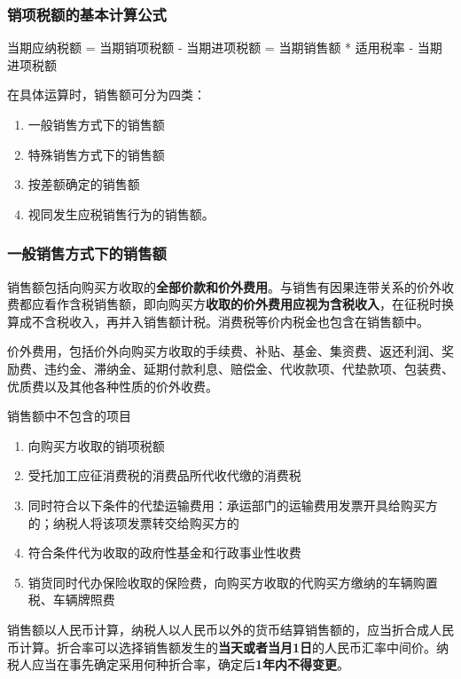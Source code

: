 \documentclass[UTF8,12pt]{ctexart}
\numberwithin{equation}{section} %
\numberwithin{figure}{section}
\numberwithin{table}{section}
\begin{document}
	\subsubsection{销项税额的基本计算公式}
	当期应纳税额 = 当期销项税额 - 当期进项税额 = 当期销售额 * 适用税率 - 当期进项税额
	
	在具体运算时，销售额可分为四类：
	\begin{enumerate}
		\item 一般销售方式下的销售额
		
		\item 特殊销售方式下的销售额
		
		\item 按差额确定的销售额
		
		\item 视同发生应税销售行为的销售额。
	\end{enumerate}
	
	\subsubsection{一般销售方式下的销售额}
	销售额包括向购买方收取的\textbf{全部价款和价外费用}。与销售有因果连带关系的价外收费都应看作含税销售额，即向购买方\textbf{收取的价外费用应视为含税收入}，在征税时换算成不含税收入，再并入销售额计税。消费税等价内税金也包含在销售额中。
	
	价外费用，包括价外向购买方收取的手续费、补贴、基金、集资费、返还利润、奖励费、违约金、滞纳金、延期付款利息、赔偿金、代收款项、代垫款项、包装费、优质费以及其他各种性质的价外收费。
	
	销售额中不包含的项目
	\begin{enumerate}
		\item 向购买方收取的销项税额
		
		\item 受托加工应征消费税的消费品所代收代缴的消费税
		
		\item 同时符合以下条件的代垫运输费用：承运部门的运输费用发票开具给购买方的；纳税人将该项发票转交给购买方的
		
		\item 符合条件代为收取的政府性基金和行政事业性收费
		
		\item 销货同时代办保险收取的保险费，向购买方收取的代购买方缴纳的车辆购置税、车辆牌照费
	\end{enumerate}
	
	销售额以人民币计算，纳税人以人民币以外的货币结算销售额的，应当折合成人民币计算。折合率可以选择销售额发生的\textbf{当天或者当月1日}的人民币汇率中间价。纳税人应当在事先确定采用何种折合率，确定后\textbf{1年内不得变更}。
	
\end{document}
